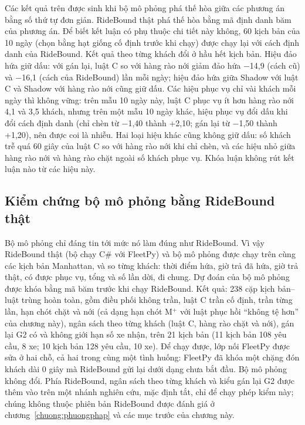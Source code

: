 Các kết quả trên được sinh khi bộ mô phỏng phá thế hòa giữa các phương án bằng số thứ tự đơn giản. RideBound thật phá thế
hòa bằng mã định danh băm của phương án. Để biết kết luận có phụ thuộc chi tiết này không, 60 kịch bản của 10 ngày (chọn
bằng hạt giống cố định trước khi chạy) được chạy lại với cách định danh của RideBound. Kết quả theo từng khách đổi ở hầu
hết kịch bản. Hiệu đảo hứa giữ dấu: với gán lại, luật C so với hàng rào nới giảm đảo hứa −14,9 (cách cũ) và −16,1 (cách
của RideBound) lần mỗi ngày; hiệu đảo hứa giữa Shadow với luật C và Shadow với hàng rào nới cũng giữ dấu. Các hiệu phục
vụ chỉ vài khách mỗi ngày thì không vững: trên mẫu 10 ngày này, luật C phục vụ ít hơn hàng rào nới 4,1 và 3,5 khách, nhưng
trên một mẫu 10 ngày khác, hiệu phục vụ đổi dấu khi đổi cách định danh (chỉ chèn từ −1,40 thành +2,10; gán lại từ −1,50
thành +1,20), nên được coi là nhiễu. Hai loại hiệu khác cũng không giữ dấu: số khách trễ quá 60 giây của luật C so với hàng
rào nới khi chỉ chèn, và các hiệu nhỏ giữa hàng rào nới và hàng rào chặt ngoài số khách phục vụ. Khóa luận không rút kết
luận nào từ các hiệu này.

\subsection{Kiểm chứng bộ mô phỏng bằng RideBound thật}
\label{muc:c4-cauno}

Bộ mô phỏng chỉ đáng tin tới mức nó làm đúng như RideBound. Vì vậy RideBound thật (bộ chạy C\# với FleetPy) và bộ mô phỏng
được chạy trên cùng các kịch bản Manhattan, và so từng khách: thời điểm hứa, giờ trả đã hứa, giờ trả thật, có được phục vụ,
tổng và số lần dời, đi chung. Dự đoán của bộ mô phỏng được khóa bằng mã băm trước khi chạy RideBound. Kết quả: 238 cặp
kịch bản--luật trùng hoàn toàn, gồm điều phối không trần, luật C trần cố định, trần từng lần, hạn chót chặt và nới (cả dạng
hạn chót M$^{+}$ với luật phục hồi ``không tệ hơn'' của chương này), ngân sách theo từng khách (luật C, hàng rào chặt và
nới), gán lại G2 có và không giới hạn số xe nhận, trên 21 kịch bản (11 kịch bản 108
yêu cầu, 8 xe; 10 kịch bản 128 yêu cầu, 10 xe). Để chạy được, lớp nối FleetPy được sửa ở hai chỗ, cả hai trong cùng một tình
huống: FleetPy đã khóa một chặng đón khách dài 0 giây mà RideBound gửi lại dưới dạng chưa bắt đầu. Bộ mô phỏng không đổi.
Phía RideBound, ngân sách theo từng khách và kiểu gán lại G2 được thêm vào trên một nhánh nghiên cứu, mặc định tắt, chỉ để
chạy phép kiểm này; chúng không thuộc phiên bản RideBound được đánh giá ở chương~\ref{chuong:phuongphap} và các mục trước
của chương này.

